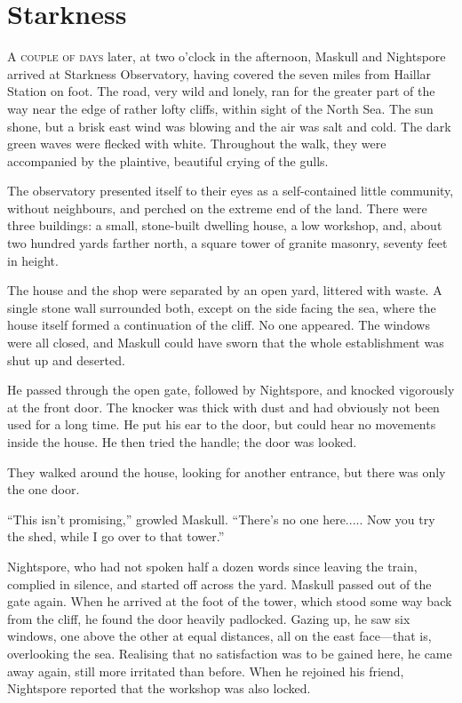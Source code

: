 \chapter{Starkness}

\lettrine{A}{ couple of days} later, at two o'clock in the afternoon, Maskull and Nightspore arrived at Starkness Observatory, having covered the seven miles from Haillar Station on foot. The road, very wild and lonely, ran for the greater part of the way near the edge of rather lofty cliffs, within sight of the North Sea. The sun shone, but a brisk east wind was blowing and the air was salt and cold. The dark green waves were flecked with white. Throughout the walk, they were accompanied by the plaintive, beautiful crying of the gulls.

The observatory presented itself to their eyes as a self-contained little community, without neighbours, and perched on the extreme end of the land. There were three buildings: a small, stone-built dwelling house, a low workshop, and, about two hundred yards farther north, a square tower of granite masonry, seventy feet in height.

The house and the shop were separated by an open yard, littered with waste. A single stone wall surrounded both, except on the side facing the sea, where the house itself formed a continuation of the cliff. No one appeared. The windows were all closed, and Maskull could have sworn that the whole establishment was shut up and deserted.

He passed through the open gate, followed by Nightspore, and knocked vigorously at the front door. The knocker was thick with dust and had obviously not been used for a long time. He put his ear to the door, but could hear no movements inside the house. He then tried the handle; the door was looked.

They walked around the house, looking for another entrance, but there was only the one door.

``This isn't promising,'' growled Maskull. ``There's no one here..... Now you try the shed, while I go over to that tower.''

Nightspore, who had not spoken half a dozen words since leaving the train, complied in silence, and started off across the yard. Maskull passed out of the gate again. When he arrived at the foot of the tower, which stood some way back from the cliff, he found the door heavily padlocked. Gazing up, he saw six windows, one above the other at equal distances, all on the east face—that is, overlooking the sea. Realising that no satisfaction was to be gained here, he came away again, still more irritated than before. When he rejoined his friend, Nightspore reported that the workshop was also locked.

